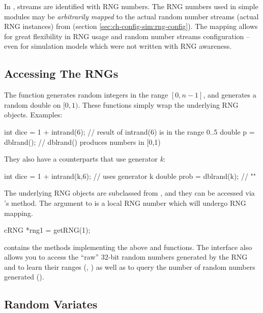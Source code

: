 In {\opp}, streams are identified with RNG numbers. The RNG numbers
used in simple modules may be \textit{arbitrarily mapped} to the actual
random number streams (actual RNG instances) from 
(section \ref{sec:ch-config-sim:rng-config}). The mapping allows
for great flexibility in RNG usage and random number streams
configuration -- even for simulation models which were not written
with RNG awareness.


\subsection{Accessing The RNGs}

The  function generates random integers in the range $[0, n-1]$, and
 generates a random double on $[0,1)$. These functions
simply wrap the underlying RNG objects. Examples:

\begin{cpp}
int dice = 1 + intrand(6); // result of intrand(6) is in the range 0..5
double p = dblrand();      // dblrand() produces numbers in [0,1)
\end{cpp}

They also have a counterparts that use generator \textit{k}:

\begin{cpp}
int dice = 1 + intrand(k,6); // uses generator k
double prob = dblrand(k);    // ""
\end{cpp}

The underlying RNG objects are subclassed from ,
and they can be accessed via 's  method.
The argument to  is a local RNG number which will undergo
RNG mapping.

\begin{cpp}
cRNG *rng1 = getRNG(1);
\end{cpp}

 contains the methods implementing the above 
and  functions. The  interface also allows
you to access the ``raw'' 32-bit random numbers generated by the RNG
and to learn their ranges (, ) as well as
to query the number of random numbers generated ().


\subsection{Random Variates}

